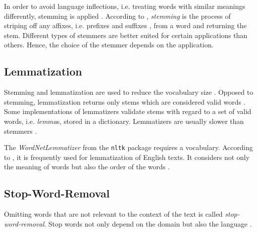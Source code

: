 In order to avoid language inflections, i.e. treating words with similar meanings differently, stemming is applied \cite{clusteringDocs2020}.
According to \citeauthor{nlp-book2009}, \textit{stemming} is the process of striping off any affixes, i.e. prefixes and suffixes \cite{IR2011}, 
from a word and returning the stem.
Different types of stemmers are better suited for certain applications than others.
Hence, the choice of the stemmer depends on the application.


\subsection{Lemmatization}\label{subsec:lemmatization}

Stemming and lemmatization are used to reduce the vocabulary size \cite{clusteringDocs2020}.
Opposed to stemming, lemmatization returns only stems which are considered valid words \cite{nlp-book2009}.
Some implementations of lemmatizers validate stems with regard to a set of valid words, i.e. \textit{lemma}s, stored in a dictionary.
Lemmatizers are usually slower than stemmers \cite{nlp-book2009}.

The \textit{WordNetLemmatizer} from the \texttt{nltk} package requires a vocabulary. %
According to \citeauthor{clusteringDocs2020}, it is frequently used for lemmatization of English texts.
It considers not only the meaning of words but also the order of the words \cite{clusteringDocs2020}.


\subsection{Stop-Word-Removal}\label{subsec:stop-word-removal}

Omitting words that are not relevant to the context of the text is called \textit{stop-word-removal}.
Stop words not only depend on the domain but also the language \cite{IR2011}.



